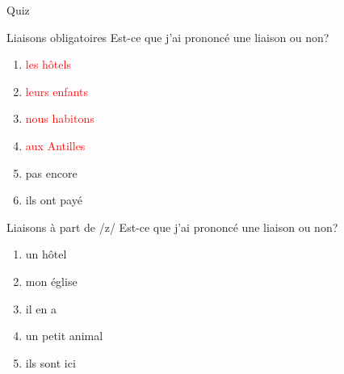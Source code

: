 \documentclass{beamer}
\begin{document}
  \begin{frame}{}
    \begin{center}
      \Large Quiz
    \end{center}
  \end{frame}

  \begin{frame}{Liaisons obligatoires}
    Est-ce que j'ai prononcé une liaison ou non?
    \begin{enumerate}
      \item \textcolor<13->{red}{les hôtels} \underline{}
      \item<3-> \textcolor<13->{red}{leurs enfants} \underline{}
      \item<5-> \textcolor<13->{red}{nous habitons} \underline{}
      \item<7-> \textcolor<13->{red}{aux Antilles} \underline{}
      \item<9-> pas encore \underline{\uncover<10->{non}}
      \item<11-> ils ont payé \underline{}
    \end{enumerate}
  \end{frame}

  \begin{frame}{Liaisons à part de /z/}
    Est-ce que j'ai prononcé une liaison ou non?
    \begin{enumerate}
      \item un hôtel \underline{\uncover<2->{oui}}
      \item<3-> mon église \underline{}
      \item<5-> il en a \underline{}
      \item<7-> un petit animal \underline{}
      \item<9-> ils sont ici \underline{}
    \end{enumerate}
  \end{frame}
\end{document}

